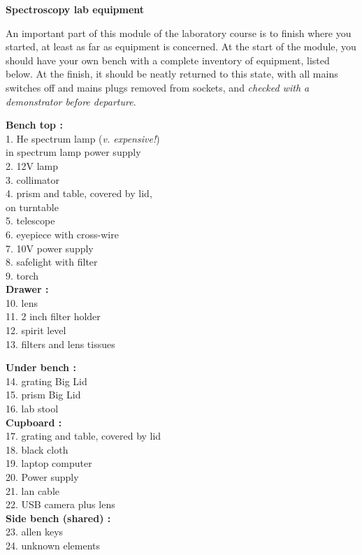 \documentclass[12pt]{article}
\begin{document}
\newpage

{\large\bf Spectroscopy lab equipment}

An important part of this module of the laboratory course is to finish where you started, at least as far as equipment is concerned. At the start of the module, you should have your own bench with a complete inventory of equipment, listed below. At the finish, it should be neatly returned to this state, with all mains switches off and mains plugs removed from sockets, and {\sl checked with a demonstrator before departure}.

\begin{minipage}[t]{0.45\linewidth}
{\bf Bench top : } \\
1. He spectrum lamp ({\em v. expensive!\/})\\
\hspace*{5mm} in spectrum lamp power supply\\
2. 12V lamp\\
3. collimator\\
4. prism and table, covered by lid,\\
\hspace*{5mm}on turntable\\
5. telescope\\
6. eyepiece with cross-wire\\
7. 10V power supply\\
8. safelight with filter \\
9. torch\\

{\bf Drawer : }\\
10. lens\\
11. 2 inch filter holder\\
12. spirit level\\
13. filters and lens tissues
\end{minipage}
\hspace{5mm}
\begin{minipage}[t]{0.45\linewidth}
{\bf Under bench : }\\
14. grating Big Lid\\
15. prism Big Lid\\
16. lab stool\\

{\bf Cupboard : }\\
17. grating and table, covered by lid\\
18. black cloth\\
19. laptop computer\\
20. Power supply \\
21. lan cable\\
22. USB camera plus lens\\

{\bf Side bench (shared) :}\\
23. allen keys\\
24. unknown elements
\end{minipage}
\end{document}
